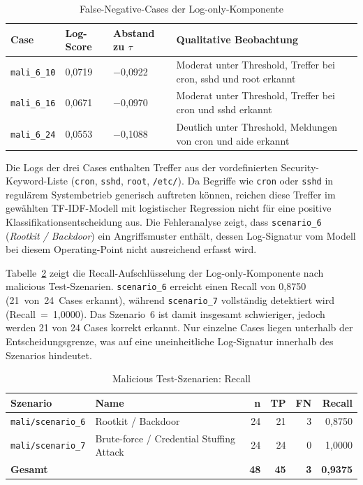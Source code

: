 \begin{table}[htb]
  \centering
  \small
  \caption{False-Negative-Cases der Log-only-Komponente}
  \label{tab:fn_cases}
  \begin{tabular}{lllp{6.2cm}}
    \hline
    \textbf{Case} & \textbf{Log-Score} & \textbf{Abstand zu $\tau$} & \textbf{Qualitative Beobachtung} \\
    \hline
    \texttt{mali\_6\_10} & 0{,}0719 & $-$0{,}0922 & Moderat unter Threshold, Treffer bei cron, sshd und root erkannt \\
    \texttt{mali\_6\_16} & 0{,}0671 & $-$0{,}0970 & Moderat unter Threshold, Treffer bei cron und sshd erkannt \\
    \texttt{mali\_6\_24} & 0{,}0553 & $-$0{,}1088 & Deutlich unter Threshold, Meldungen von cron und aide erkannt \\
    \hline
  \end{tabular}
\end{table}

Die Logs der drei Cases enthalten Treffer aus der vordefinierten Security-Keyword-Liste (\texttt{cron}, \texttt{sshd}, \texttt{root}, \texttt{/etc/}). Da Begriffe wie \texttt{cron} oder \texttt{sshd} in regulärem Systembetrieb generisch auftreten können, reichen diese Treffer im gewählten TF-IDF-Modell mit logistischer Regression nicht für eine positive Klassifikationsentscheidung aus. Die Fehleranalyse zeigt, dass \texttt{scenario\_6} (\emph{Rootkit / Backdoor}) ein Angriffsmuster enthält, dessen Log-Signatur vom Modell bei diesem Operating-Point nicht ausreichend erfasst wird.

Tabelle~\ref{tab:mali_scenario_recall} zeigt die Recall-Auf\-schlüs\-se\-lung der Log-only-Komponente nach malicious Test-Szenarien. \texttt{scenario\_6} erreicht einen Recall von 0{,}8750 (21~von~24~Cases erkannt), während \texttt{scenario\_7} vollständig detektiert wird (Recall~=~1{,}0000). Das Szenario~6 ist damit insgesamt schwieriger, jedoch werden 21 von 24 Cases korrekt erkannt. Nur einzelne Cases liegen unterhalb der Entscheidungsgrenze, was auf eine uneinheitliche Log-Signatur innerhalb des Szenarios hindeutet.

\begin{table}[htb]
  \centering
  \caption{Malicious Test-Szenarien: Recall}
  \label{tab:mali_scenario_recall}
  \begin{tabular}{llrrrr}
    \hline
    \textbf{Szenario} & \textbf{Name} & \textbf{n} & \textbf{TP} & \textbf{FN} & \textbf{Recall} \\
    \hline
    \texttt{mali/scenario\_6} & Rootkit / Backdoor & 24 & 21 & 3 & 0{,}8750 \\
    \texttt{mali/scenario\_7} & Brute-force / Credential Stuffing Attack & 24 & 24 & 0 & 1{,}0000 \\
    \hline
    \textbf{Gesamt} & & \textbf{48} & \textbf{45} & \textbf{3} & \textbf{0{,}9375} \\
    \hline
  \end{tabular}
\end{table}


